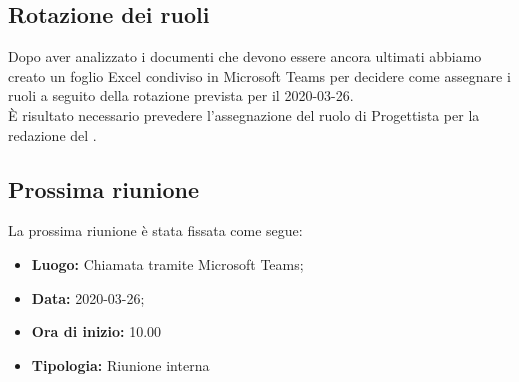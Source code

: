 	\subsection{Rotazione dei ruoli}
		Dopo aver analizzato i documenti che devono essere ancora ultimati abbiamo creato un foglio Excel condiviso in Microsoft Teams per decidere come assegnare i ruoli a seguito della rotazione prevista per il 2020-03-26. \\
		È risultato necessario prevedere l'assegnazione del ruolo di Progettista per la redazione del \PdQ.

	\subsection{Prossima riunione}
		La prossima riunione è stata fissata come segue: 
		\begin{itemize}
			\item \textbf{Luogo: } Chiamata tramite Microsoft Teams; 
			\item \textbf{Data: } 2020-03-26; 
			\item \textbf{Ora di inizio: } 10.00
			\item \textbf{Tipologia: } Riunione interna
		\end{itemize}